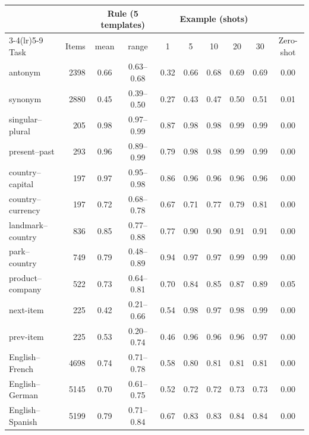 \begin{tabular}{@{}lrcccccccc@{}}
\toprule
 & & \multicolumn{2}{c}{Rule (5 templates)} & \multicolumn{5}{c}{Example (shots)} & \\
\cmidrule(lr){3-4}\cmidrule(lr){5-9}
Task & Items & mean & range & 1 & 5 & 10 & 20 & 30 & Zero-shot \\
\midrule
antonym & 2398 & 0.66 & 0.63--0.68 & 0.32 & 0.66 & 0.68 & 0.69 & 0.69 & 0.00 \\
synonym & 2880 & 0.45 & 0.39--0.50 & 0.27 & 0.43 & 0.47 & 0.50 & 0.51 & 0.01 \\
singular--plural & 205 & 0.98 & 0.97--0.99 & 0.87 & 0.98 & 0.98 & 0.99 & 0.99 & 0.00 \\
present--past & 293 & 0.96 & 0.89--0.99 & 0.79 & 0.98 & 0.98 & 0.99 & 0.99 & 0.00 \\
country--capital & 197 & 0.97 & 0.95--0.98 & 0.86 & 0.96 & 0.96 & 0.96 & 0.96 & 0.00 \\
country--currency & 197 & 0.72 & 0.68--0.78 & 0.67 & 0.71 & 0.77 & 0.79 & 0.81 & 0.00 \\
landmark--country & 836 & 0.85 & 0.77--0.88 & 0.77 & 0.90 & 0.90 & 0.91 & 0.91 & 0.00 \\
park--country & 749 & 0.79 & 0.48--0.89 & 0.94 & 0.97 & 0.97 & 0.99 & 0.99 & 0.00 \\
product--company & 522 & 0.73 & 0.64--0.81 & 0.70 & 0.84 & 0.85 & 0.87 & 0.89 & 0.05 \\
next-item & 225 & 0.42 & 0.21--0.66 & 0.54 & 0.98 & 0.97 & 0.98 & 0.99 & 0.00 \\
prev-item & 225 & 0.53 & 0.20--0.74 & 0.46 & 0.96 & 0.96 & 0.96 & 0.97 & 0.00 \\
English--French & 4698 & 0.74 & 0.71--0.78 & 0.58 & 0.80 & 0.81 & 0.81 & 0.81 & 0.00 \\
English--German & 5145 & 0.70 & 0.61--0.75 & 0.52 & 0.72 & 0.72 & 0.73 & 0.73 & 0.00 \\
English--Spanish & 5199 & 0.79 & 0.71--0.84 & 0.67 & 0.83 & 0.83 & 0.84 & 0.84 & 0.00 \\
\bottomrule
\end{tabular}
